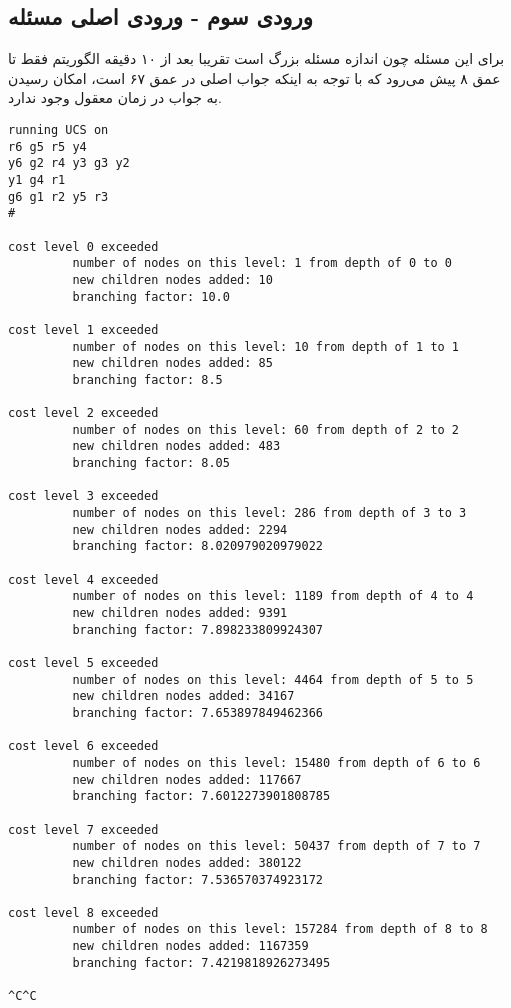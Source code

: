 \documentclass{article}
\begin{document}
\newpage
\subsection*{ورودی سوم - ورودی اصلی مسئله}
برای این مسئله چون اندازه مسئله بزرگ است تقریبا بعد از ۱۰ دقیقه الگوریتم فقط تا عمق ۸ پیش ‌می‌رود که با توجه به اینکه جواب اصلی در عمق ۶۷ است، امکان رسیدن به جواب در زمان معقول وجود ندارد.
\begin{latin}
\begin{lstlisting}
running UCS on 
r6 g5 r5 y4
y6 g2 r4 y3 g3 y2
y1 g4 r1
g6 g1 r2 y5 r3
#

cost level 0 exceeded
         number of nodes on this level: 1 from depth of 0 to 0
         new children nodes added: 10
         branching factor: 10.0

cost level 1 exceeded
         number of nodes on this level: 10 from depth of 1 to 1
         new children nodes added: 85
         branching factor: 8.5

cost level 2 exceeded
         number of nodes on this level: 60 from depth of 2 to 2
         new children nodes added: 483
         branching factor: 8.05

cost level 3 exceeded
         number of nodes on this level: 286 from depth of 3 to 3
         new children nodes added: 2294
         branching factor: 8.020979020979022

cost level 4 exceeded
         number of nodes on this level: 1189 from depth of 4 to 4
         new children nodes added: 9391
         branching factor: 7.898233809924307

cost level 5 exceeded
         number of nodes on this level: 4464 from depth of 5 to 5
         new children nodes added: 34167
         branching factor: 7.653897849462366

cost level 6 exceeded
         number of nodes on this level: 15480 from depth of 6 to 6
         new children nodes added: 117667
         branching factor: 7.6012273901808785

cost level 7 exceeded
         number of nodes on this level: 50437 from depth of 7 to 7
         new children nodes added: 380122
         branching factor: 7.536570374923172

cost level 8 exceeded
         number of nodes on this level: 157284 from depth of 8 to 8
         new children nodes added: 1167359
         branching factor: 7.4219818926273495

^C^C
\end{lstlisting}
\end{latin}
\end{document}
